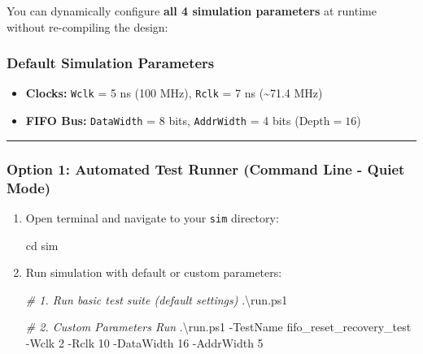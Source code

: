 \documentclass[
]{article}
\newenvironment{Shaded}{}{}
\newcommand{\BuiltInTok}[1]{\textcolor[rgb]{0.00,0.50,0.00}{#1}}
\newcommand{\CommentTok}[1]{\textcolor[rgb]{0.38,0.63,0.69}{\textit{#1}}}
\newcommand{\DecValTok}[1]{\textcolor[rgb]{0.25,0.63,0.44}{#1}}
\newcommand{\FunctionTok}[1]{\textcolor[rgb]{0.02,0.16,0.49}{#1}}
\newcommand{\NormalTok}[1]{#1}
\newcommand{\OperatorTok}[1]{\textcolor[rgb]{0.40,0.40,0.40}{#1}}
\providecommand{\tightlist}{%
  \setlength{\itemsep}{0pt}\setlength{\parskip}{0pt}}
\begin{document}
You can dynamically configure \textbf{all 4 simulation parameters} at
runtime without re-compiling the design:

\subsubsection{Default Simulation
Parameters}\label{default-simulation-parameters}

\begin{itemize}
\tightlist
\item
  \textbf{Clocks:} \texttt{Wclk} = 5 ns (100 MHz), \texttt{Rclk} = 7 ns
  (\textasciitilde71.4 MHz)
\item
  \textbf{FIFO Bus:} \texttt{DataWidth} = 8 bits, \texttt{AddrWidth} = 4
  bits (\(\text{Depth} = 16\))
\end{itemize}

\begin{center}\rule{0.5\linewidth}{0.5pt}\end{center}

\subsubsection{Option 1: Automated Test Runner (Command Line - Quiet
Mode)}\label{option-1-automated-test-runner-command-line---quiet-mode}

\begin{enumerate}
\def\labelenumi{\arabic{enumi}.}
\tightlist
\item
  Open terminal and navigate to your \texttt{sim} directory:

\begin{Shaded}
\begin{Highlighting}[]
\BuiltInTok{cd}\NormalTok{ sim}
\end{Highlighting}
\end{Shaded}
\item
  Run simulation with default or custom parameters:

\begin{Shaded}
\begin{Highlighting}[]
\CommentTok{\# 1. Run basic test suite (default settings)}
\OperatorTok{.}\NormalTok{\textbackslash{}run}\OperatorTok{.}\FunctionTok{ps1}

\CommentTok{\# 2. Custom Parameters Run}
\OperatorTok{.}\NormalTok{\textbackslash{}run}\OperatorTok{.}\FunctionTok{ps1} \OperatorTok{{-}}\NormalTok{TestName fifo\_reset\_recovery\_test }\OperatorTok{{-}}\NormalTok{Wclk }\DecValTok{2} \OperatorTok{{-}}\NormalTok{Rclk }\DecValTok{10} \OperatorTok{{-}}\NormalTok{DataWidth }\DecValTok{16} \OperatorTok{{-}}\NormalTok{AddrWidth }\DecValTok{5}
\end{Highlighting}
\end{Shaded}
\end{enumerate}
\end{document}
